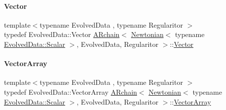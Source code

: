 \paragraph{\texorpdfstring{Vector}{Vector}}
{\footnotesize\ttfamily template$<$typename Evolved\+Data , typename Regularitor $>$ \\
typedef Evolved\+Data\+::\+Vector \mbox{\hyperlink{class_a_rchain}{A\+Rchain}}$<$ \mbox{\hyperlink{class_newtonian}{Newtonian}}$<$ typename \mbox{\hyperlink{class_a_rchain_a707e42a79e4744424a34c9007e84ee07}{Evolved\+Data\+::\+Scalar}} $>$, Evolved\+Data, Regularitor $>$\+::\mbox{\hyperlink{class_a_rchain_3_01_newtonian_3_01typename_01_evolved_data_1_1_scalar_01_4_00_01_evolved_data_00_01_regularitor_01_4_a0adb648f04fbe3ba3a0289376b56a9e1}{Vector}}}

\mbox{\label{class_a_rchain_3_01_newtonian_3_01typename_01_evolved_data_1_1_scalar_01_4_00_01_evolved_data_00_01_regularitor_01_4_a1ff7d2e64f488df9edae2ad796945bbd}} 
\paragraph{\texorpdfstring{Vector\+Array}{VectorArray}}
{\footnotesize\ttfamily template$<$typename Evolved\+Data , typename Regularitor $>$ \\
typedef Evolved\+Data\+::\+Vector\+Array \mbox{\hyperlink{class_a_rchain}{A\+Rchain}}$<$ \mbox{\hyperlink{class_newtonian}{Newtonian}}$<$ typename \mbox{\hyperlink{class_a_rchain_a707e42a79e4744424a34c9007e84ee07}{Evolved\+Data\+::\+Scalar}} $>$, Evolved\+Data, Regularitor $>$\+::\mbox{\hyperlink{class_a_rchain_3_01_newtonian_3_01typename_01_evolved_data_1_1_scalar_01_4_00_01_evolved_data_00_01_regularitor_01_4_a1ff7d2e64f488df9edae2ad796945bbd}{Vector\+Array}}}



